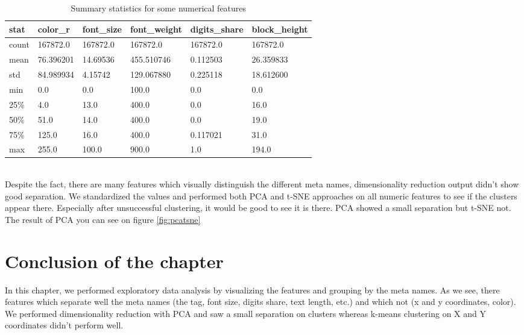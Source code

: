 \begin{table}[h]
\begin{center}
{\renewcommand{\arraystretch}{1.5}
\begin{tabular}{| p{0.8cm} | p{2cm}|  p{2cm}|  p{2.3cm}|  p{2.3cm}|  p{2.4cm}|}
\hline
\textbf{stat}    &    \textbf{color\_r}    &    \textbf{font\_size}    &    \textbf{font\_weight}    &    \textbf{digits\_share}    &    \textbf{block\_height}\\
\hline
count    &    167872.0    &    167872.0    &    167872.0    &    167872.0    &    167872.0\\
\hline
mean    &    76.396201    &    14.69536    &    455.510746    &    0.112503    &    26.359833\\
\hline
std    &    84.989934    &    4.15742    &    129.067880    &    0.225118    &    18.612600\\
\hline
min    &    0.0    &    0.0    &    100.0    &    0.0    &    0.0\\
\hline
25\%    &    4.0    &    13.0    &    400.0    &    0.0    &    16.0\\
\hline
50\%    &    51.0    &    14.0    &    400.0    &    0.0    &    19.0\\
\hline
75\%    &    125.0    &    16.0    &    400.0    &    0.117021    &    31.0\\
\hline
max    &    255.0    &    100.0    &    900.0    &    1.0    &    194.0\\
\hline
\end{tabular}}
\caption{Summary statistics for some numerical features}
\label{table:sumstatnum}
\end{center}
\end{table}  \\  

Despite the fact, there are many features which visually distinguish the different meta names, dimensionality reduction output didn't show good separation. We standardized the values and performed both PCA and t-SNE approaches on all numeric features to see if the clusters appear there. Especially after unsuccessful clustering, it would be good to see it is there. PCA showed a small separation but t-SNE not. The result of PCA you can see on figure \ref{fig:pcatsne}
 
\section*{Conclusion of the chapter}
In this chapter, we performed exploratory data analysis by visualizing the features and grouping by the meta names. As we see, there features which separate well the meta names (the tag, font size, digits share, text length, etc.) and which not (x and y coordinates, color). We performed dimensionality reduction with PCA and saw a small separation on clusters whereas k-means clustering on X and Y coordinates didn't perform well.  